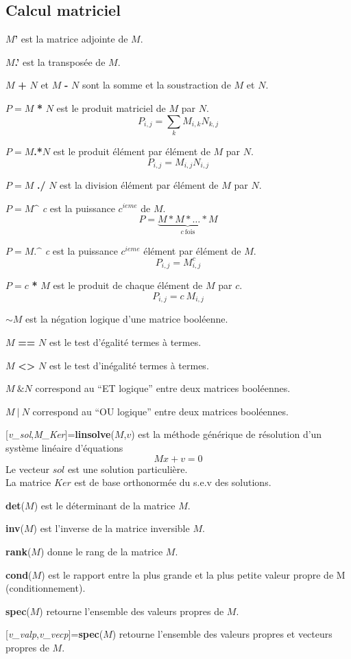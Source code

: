 \documentclass{article}
\begin{document}
\begin{multicols}{3}
\section{Calcul matriciel}
\begin{description}
\item{$M$\textbf{'}} est la matrice adjointe de $M$.
\item{$M$\textbf{.'}} est la transposée de $M$.
\item{$M$\textbf{ + }$N$ et $M$\textbf{ - }$N$} sont la somme et la soustraction de $M$ et $N$.
\item{$P = M$ \textbf{*} $N$} est le produit matriciel de $M$ par $N$.
$$P_{i,j} =\sum_{k} M_{i,k}N_{k,j}$$
\item{$P = M$\textbf{.*}$N$} est le produit élément par élément de $M$ par $N$.
$$P_{i,j} = M_{i,j} N_{i,j}$$
\item{$P = M$ \textbf{./} $N$} est la division élément par élément de $M$ par $N$.
\item{$P = M$\textbf{$\^$} \textit{c}} est la puissance $c^{ieme}$ de $M$.
$$P = \underbrace{M*M*\ldots*M}_{c~\mbox{fois}}$$
\item{$P = M$\textbf{$.\^$} \textit{c}} est la puissance $c^{ieme}$ élément par élément de $M$.
$$P_{i,j} = M_{i,j}^{c}$$
\item{$P = c$ \textbf{*} $M$} est le produit de chaque élément de $M$ par $c$.
$$P_{i,j} = c ~ M_{i,j}$$
\item{$\mathbf{\sim}M$}  est la négation logique d'une matrice booléenne.
\item{$M$ \textbf{==} $N$}  est le test d'égalité termes à termes.
\item{$M$ \textbf{<>} $N$}  est le test d'inégalité termes à termes.
\item{$M~\mathbf{\&}N$} correspond au ``ET logique'' entre deux matrices booléennes.
\item{$M ~\mathbf{|}~N$} correspond au ``OU logique'' entre deux matrices booléennes.

\item{[\textit{v\_sol},\textit{M\_Ker}]=\textbf{linsolve}($M$,$v$)} est la méthode générique de résolution d'un système linéaire d'équations
$$Mx+v=0$$
Le vecteur $sol$ est une solution particulière.\\
La matrice $Ker$ est de base orthonormée du s.e.v des solutions.
\item{\textbf{det}($M$)} est le déterminant de la matrice $M$.
\item{\textbf{inv}($M$)} est l'inverse de la matrice inversible $M$.
\item{\textbf{rank}($M$)} donne le rang de la matrice $M$.
\item{\textbf{cond}($M$)} est le rapport entre la plus grande et la plus petite valeur propre de M (conditionnement).
\item{\textbf{spec}($M$)} retourne l'ensemble des valeurs propres de $M$.
\item{[\textit{v\_valp},\textit{v\_vecp}]=\textbf{spec}($M$)} retourne l'ensemble des valeurs propres et vecteurs propres de $M$.
 

\end{description}
\end{multicols}
\end{document}
